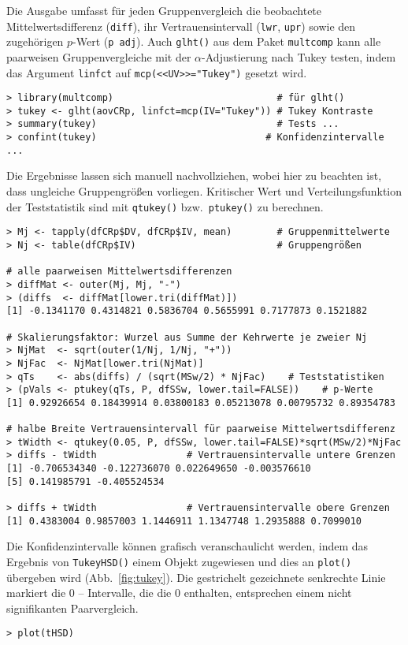Die Ausgabe umfasst für jeden Gruppenvergleich die beobachtete Mittelwertsdifferenz (\lstinline!diff!), ihr Vertrauensintervall (\lstinline!lwr!, \lstinline!upr!) sowie den zugehörigen $p$-Wert (\lstinline!p adj!). Auch \lstinline!glht()! aus dem Paket \lstinline!multcomp! kann alle paarweisen Gruppenvergleiche mit der $\alpha$-Adjustierung nach Tukey testen, indem das Argument \lstinline!linfct! auf \lstinline!mcp(<<UV>>="Tukey")! gesetzt wird.
\begin{lstlisting}
> library(multcomp)                             # für glht()
> tukey <- glht(aovCRp, linfct=mcp(IV="Tukey")) # Tukey Kontraste
> summary(tukey)                                # Tests ...
> confint(tukey)                              # Konfidenzintervalle ...
\end{lstlisting}

Die Ergebnisse lassen sich manuell nachvollziehen, wobei hier zu beachten ist, dass ungleiche Gruppengrößen vorliegen. Kritischer Wert und Verteilungsfunktion der Teststatistik sind mit \lstinline!qtukey()! bzw.\ \lstinline!ptukey()! zu berechnen.
\begin{lstlisting}
> Mj <- tapply(dfCRp$DV, dfCRp$IV, mean)        # Gruppenmittelwerte
> Nj <- table(dfCRp$IV)                         # Gruppengrößen

# alle paarweisen Mittelwertsdifferenzen
> diffMat <- outer(Mj, Mj, "-")
> (diffs  <- diffMat[lower.tri(diffMat)])
[1] -0.1341170 0.4314821 0.5836704 0.5655991 0.7177873 0.1521882

# Skalierungsfaktor: Wurzel aus Summe der Kehrwerte je zweier Nj
> NjMat  <- sqrt(outer(1/Nj, 1/Nj, "+"))
> NjFac  <- NjMat[lower.tri(NjMat)]
> qTs    <- abs(diffs) / (sqrt(MSw/2) * NjFac)    # Teststatistiken
> (pVals <- ptukey(qTs, P, dfSSw, lower.tail=FALSE))    # p-Werte
[1] 0.92926654 0.18439914 0.03800183 0.05213078 0.00795732 0.89354783

# halbe Breite Vertrauensintervall für paarweise Mittelwertsdifferenz
> tWidth <- qtukey(0.05, P, dfSSw, lower.tail=FALSE)*sqrt(MSw/2)*NjFac
> diffs - tWidth                # Vertrauensintervalle untere Grenzen
[1] -0.706534340 -0.122736070 0.022649650 -0.003576610
[5] 0.141985791 -0.405524534

> diffs + tWidth                # Vertrauensintervalle obere Grenzen
[1] 0.4383004 0.9857003 1.1446911 1.1347748 1.2935888 0.7099010
\end{lstlisting}

Die Konfidenzintervalle können grafisch veranschaulicht werden, indem das Ergebnis von \lstinline!TukeyHSD()! einem Objekt zugewiesen und dies an \lstinline!plot()! übergeben wird (Abb.\ \ref{fig:tukey}). Die gestrichelt gezeichnete senkrechte Linie markiert die $0$ -- Intervalle, die die $0$ enthalten, entsprechen einem nicht signifikanten Paarvergleich.
\begin{lstlisting}
> plot(tHSD)
\end{lstlisting}

